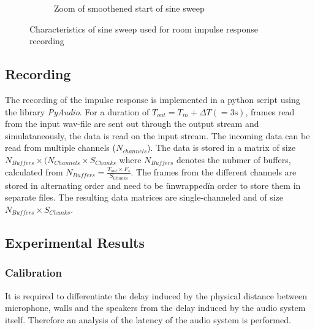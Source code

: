 \begin{figure}[htb]
\begin{subfigure}[b]{0.49\linewidth}
        \caption{Zoom of smoothened start of sine sweep}
        \label{fig:sweep_start}
	\end{subfigure}
	\caption{Characteristics of sine sweep used for room impulse response recording} 
	\label{fig:sweep}
\end{figure}


\subsection{Recording}

The recording of the impulse response is implemented in a python script using the library \textit{PyAudio}. For a duration of $T_{out}=T_{in} + \Delta T (= 3\text{s})$, frames read from the input wav-file are sent out through the output stream and simulataneously, the data is read on the input stream. 
The incoming data can be read from multiple channels ($N_{channels}$). 
The data is stored in a matrix of size $N_{Buffers} \times (N_{Channels} \times  S_{Chunks}$ where $N_{Buffers}$ denotes the nubmer of buffers, calculated from $N_{Buffers} = \frac{T_{out} \times F_s}{S_{Chunks}}$.
The frames from the different channels are stored in alternating order and need to be \"unwrapped\" in order to store them in separate files. The resulting data matrices are single-channeled and of size $N_{Buffers} \times  S_{Chunks}$.


\subsection{Experimental Results}

\subsubsection{Calibration}
It is required to differentiate the delay induced by the physical distance between microphone, walls and the speakers from the delay induced by the audio system itself. Therefore an analysis of the latency of the audio system is performed. 


